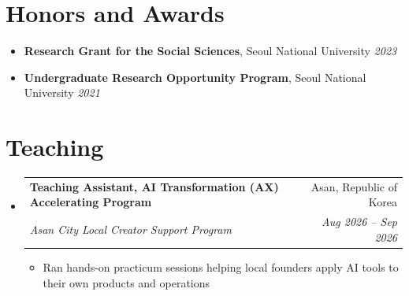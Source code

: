 \documentclass[letterpaper,10pt]{article}
\makeatletter
\newcommand{\ENTRYSEP}{0.4em}\newcommand{\PLAINSEP}{0.3em}
\newcommand{\DETSEP}{0.14em}\newcommand{\TOPSEP}{0.35em}
\newcommand{\ENTRYDROP}{-0.15em}
\newcommand{\ENTRYSEP}{0.18em}\newcommand{\PLAINSEP}{0.15em}
\newcommand{\DETSEP}{0.06em}\newcommand{\TOPSEP}{0.18em}
\newcommand{\ENTRYDROP}{-0.35em}
\let\oldsection\section
\renewcommand{\section}[1]{\needspace{8\baselineskip}\oldsection{#1}}
\newcommand{\entry}[4]{%
  \needspace{3.2\baselineskip}\item
  \begin{tabularx}{\linewidth}[t]{@{}>{\raggedright\arraybackslash}X@{\hspace{1.2em}}r@{}}
    \textbf{#1} & #2 \\[0.05em]
    \textit{\small #3} & \textit{\small #4} \\
  \end{tabularx}\vspace{\ENTRYDROP}%
}
\newenvironment{entries}
  {\begin{itemize}[leftmargin=1.2em, itemsep=\ENTRYSEP, parsep=0pt, topsep=\TOPSEP]}
  {\end{itemize}}
\newenvironment{details}
  {\begin{itemize}[label=$\circ$, leftmargin=1.4em, itemsep=\DETSEP, parsep=0pt, topsep=\TOPSEP]}
  {\end{itemize}\vspace{-0.2em}}
\newenvironment{plain}
  {\begin{itemize}[leftmargin=1.2em, itemsep=\PLAINSEP, parsep=0pt, topsep=\TOPSEP]}
  {\end{itemize}}
\makeatother
\begin{document}
\section{Honors and Awards}
\begin{plain}
  \item \textbf{Research Grant for the Social Sciences}, Seoul National University
        \hfill \textit{\small 2023}
  \item \textbf{Undergraduate Research Opportunity Program}, Seoul National University
        \hfill \textit{\small 2021}
\end{plain}

\section{Teaching}
\begin{entries}
  \entry{Teaching Assistant, AI Transformation (AX) Accelerating Program}{Asan, Republic of Korea}
        {Asan City Local Creator Support Program}{Aug 2026 -- Sep 2026}
  \begin{details}
    \item Ran hands-on practicum sessions helping local founders apply AI tools to their own
          products and operations
  \end{details}
\end{entries}

\end{document}
